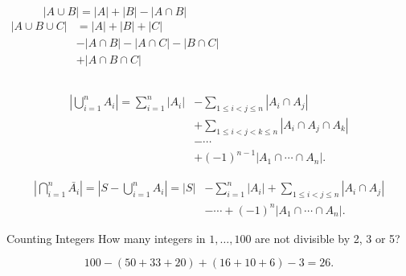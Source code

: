 \begin{frame}{}
  \begin{columns}
      \[
	|A \cup B| = |A| + |B| - |A \cap B|
      \]
      \pause
      \begin{align*}
        \left|A \cup B \cup C \right| &= |A| + |B| + |C| \\
	  &- |A \cap B| - |A \cap C| - |B \cap C| \\
	  &+ |A \cap B \cap C|
      \end{align*}
  \end{columns}
\end{frame}

\begin{frame}{}
  \begin{theorem}
    \begin{align*}
      \left|\bigcup_{i=1}^n A_i\right| =
        \sum_{i=1}^n |A_i| &- \sum_{1 \leqslant i < j \leqslant n} |A_i\cap A_j| \\[8pt]
	&+ \sum_{1 \leqslant i < j < k \leqslant n} |A_i \cap A_j\cap A_k| \\[8pt]
	&- \cdots \\[8pt]
	&+ (-1)^{n-1} \left|A_1\cap\cdots\cap A_n\right|.
    \end{align*}
  \end{theorem}

  \pause
  \begin{align*}
    \left|\bigcap_{i=1}^n \bar{A_i}\right| = \left|S - \bigcup_{i=1}^n A_i \right|
      = |S| &- \sum_{i=1}^n |A_i|
        + \sum_{1 \leqslant i < j \leqslant n} |A_i\cap A_j| \\[8pt]
        &- \cdots + (-1)^n |A_1\cap\cdots\cap A_n|.
  \end{align*}
\end{frame}

\begin{frame}{}
  \begin{exampleblock}{Counting Integers}
    How many integers in ${1, \ldots, 100}$ are not divisible by 2, 3 or 5?
  \end{exampleblock}

  \pause
  \[
    100 - (50 + 33 + 20) + (16 + 10 + 6) - 3 = 26.
  \]
\end{frame}

